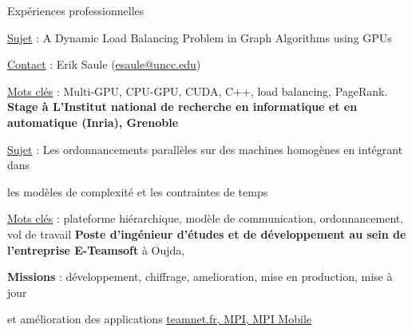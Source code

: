 \begin{rubric}{Expériences professionnelles}
     \hfill{} 
	\par \underline{Sujet} : A Dynamic Load Balancing Problem in Graph Algorithms using GPUs
    \par \underline{Contact} : Erik Saule (\href{mailto:esaule@uncc.edu}{esaule@uncc.edu})
	\par \underline{Mots clés} : Multi-GPU, CPU-GPU, CUDA, C++, load balancing, PageRank.
%
%
    \textbf{Stage à L'Institut national de recherche en informatique et en automatique (Inria), Grenoble}
     \hfill{} 
	\par \underline{Sujet} : Les ordonnancements parallèles sur des machines homogènes en intégrant dans
    \par les modèles de complexité et les contraintes de temps
	\par \underline{Mots clés} : plateforme hiérarchique, modèle de communication, ordonnancement, vol de travail
%
%
	\textbf{Poste d'ingénieur d'études et de développement au sein de l’entreprise E-Teamsoft} à Oujda, 
     \hfill{} 
	\par \textbf{Missions} : développement, chiffrage, amelioration, mise en production,
                              mise à jour \par et amélioration des applications \url{teamnet.fr, MPI, MPI Mobile} 
%

\end{rubric}
